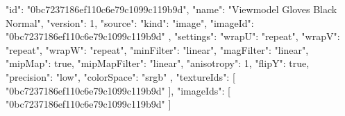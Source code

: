 {
  "id": "0bc7237186ef110c6e79c1099c119b9d",
  "name": "Viewmodel Gloves Black Normal",
  "version": 1,
  "source": {
    "kind": "image",
    "imageId": "0bc7237186ef110c6e79c1099c119b9d"
  },
  "settings": {
    "wrapU": "repeat",
    "wrapV": "repeat",
    "wrapW": "repeat",
    "minFilter": "linear",
    "magFilter": "linear",
    "mipMap": true,
    "mipMapFilter": "linear",
    "anisotropy": 1,
    "flipY": true,
    "precision": "low",
    "colorSpace": "srgb"
  },
  "textureIds": [
    "0bc7237186ef110c6e79c1099c119b9d"
  ],
  "imageIds": [
    "0bc7237186ef110c6e79c1099c119b9d"
  ]
}
